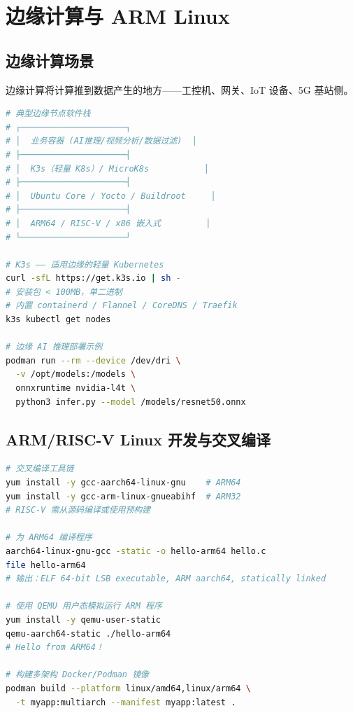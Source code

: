 \documentclass[12pt,UTF8]{ctexbook}
\begin{document}
\section{边缘计算与 ARM Linux}
\label{sec:edge-arm}

\subsection{边缘计算场景}

边缘计算将计算推到数据产生的地方——工控机、网关、IoT 设备、5G 基站侧。

\begin{lstlisting}[language=bash]
# 典型边缘节点软件栈
# ┌─────────────────────┐
# │  业务容器 (AI推理/视频分析/数据过滤)  │
# ├─────────────────────┤
# │  K3s（轻量 K8s）/ MicroK8s           │
# ├─────────────────────┤
# │  Ubuntu Core / Yocto / Buildroot     │
# ├─────────────────────┤
# │  ARM64 / RISC-V / x86 嵌入式         │
# └─────────────────────┘

# K3s —— 适用边缘的轻量 Kubernetes
curl -sfL https://get.k3s.io | sh -
# 安装包 < 100MB，单二进制
# 内置 containerd / Flannel / CoreDNS / Traefik
k3s kubectl get nodes

# 边缘 AI 推理部署示例
podman run --rm --device /dev/dri \
  -v /opt/models:/models \
  onnxruntime nvidia-l4t \
  python3 infer.py --model /models/resnet50.onnx
\end{lstlisting}

\subsection{ARM/RISC-V Linux 开发与交叉编译}

\begin{lstlisting}[language=bash]
# 交叉编译工具链
yum install -y gcc-aarch64-linux-gnu    # ARM64
yum install -y gcc-arm-linux-gnueabihf  # ARM32
# RISC-V 需从源码编译或使用预构建

# 为 ARM64 编译程序
aarch64-linux-gnu-gcc -static -o hello-arm64 hello.c
file hello-arm64
# 输出：ELF 64-bit LSB executable, ARM aarch64, statically linked

# 使用 QEMU 用户态模拟运行 ARM 程序
yum install -y qemu-user-static
qemu-aarch64-static ./hello-arm64
# Hello from ARM64！

# 构建多架构 Docker/Podman 镜像
podman build --platform linux/amd64,linux/arm64 \
  -t myapp:multiarch --manifest myapp:latest .
\end{lstlisting}
\end{document}
